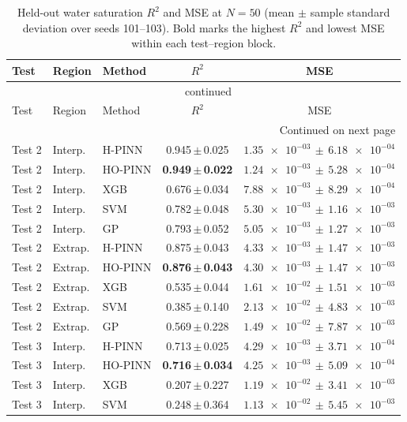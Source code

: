 \begingroup
\small
\setlength{\tabcolsep}{6pt}
\begin{longtable}{lllcc}
\caption{Held-out water saturation $R^2$ and MSE at $N=50$ (mean $\pm$ sample standard deviation over seeds 101--103). Bold marks the highest $R^2$ and lowest MSE within each test--region block.}\label{tab:swat_r2_mse_n50}\\
\toprule
Test & Region & Method & $R^2$ & MSE \\
\midrule
\endfirsthead
\multicolumn{5}{c}{\tablename~\thetable{} continued} \\
\toprule
Test & Region & Method & $R^2$ & MSE \\
\midrule
\endhead
\midrule
\multicolumn{5}{r}{Continued on next page} \\
\endfoot
\bottomrule
\endlastfoot
Test 2 & Interp. & H-PINN & 0.945\,$\pm$\,0.025 & $\num{1.35e-03}\,\pm\,\num{6.18e-04}$ \\
Test 2 & Interp. & HO-PINN & \textbf{0.949\,$\pm$\,0.022} & \textbf{$\num{1.24e-03}\,\pm\,\num{5.28e-04}$} \\
Test 2 & Interp. & XGB & 0.676\,$\pm$\,0.034 & $\num{7.88e-03}\,\pm\,\num{8.29e-04}$ \\
Test 2 & Interp. & SVM & 0.782\,$\pm$\,0.048 & $\num{5.30e-03}\,\pm\,\num{1.16e-03}$ \\
Test 2 & Interp. & GP & 0.793\,$\pm$\,0.052 & $\num{5.05e-03}\,\pm\,\num{1.27e-03}$ \\
\addlinespace[2pt]
Test 2 & Extrap. & H-PINN & 0.875\,$\pm$\,0.043 & $\num{4.33e-03}\,\pm\,\num{1.47e-03}$ \\
Test 2 & Extrap. & HO-PINN & \textbf{0.876\,$\pm$\,0.043} & \textbf{$\num{4.30e-03}\,\pm\,\num{1.47e-03}$} \\
Test 2 & Extrap. & XGB & 0.535\,$\pm$\,0.044 & $\num{1.61e-02}\,\pm\,\num{1.51e-03}$ \\
Test 2 & Extrap. & SVM & 0.385\,$\pm$\,0.140 & $\num{2.13e-02}\,\pm\,\num{4.83e-03}$ \\
Test 2 & Extrap. & GP & 0.569\,$\pm$\,0.228 & $\num{1.49e-02}\,\pm\,\num{7.87e-03}$ \\
\addlinespace[2pt]
Test 3 & Interp. & H-PINN & 0.713\,$\pm$\,0.025 & $\num{4.29e-03}\,\pm\,\num{3.71e-04}$ \\
Test 3 & Interp. & HO-PINN & \textbf{0.716\,$\pm$\,0.034} & \textbf{$\num{4.25e-03}\,\pm\,\num{5.09e-04}$} \\
Test 3 & Interp. & XGB & 0.207\,$\pm$\,0.227 & $\num{1.19e-02}\,\pm\,\num{3.41e-03}$ \\
Test 3 & Interp. & SVM & 0.248\,$\pm$\,0.364 & $\num{1.13e-02}\,\pm\,\num{5.45e-03}$ \\

\end{longtable}
